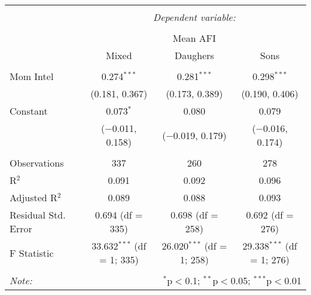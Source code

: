 
\begingroup 
\small 
\begin{tabular}{@{\extracolsep{1pt}}lccc} 
\\[-1.8ex]\hline 
\hline \\[-1.8ex] 
 & \multicolumn{3}{c}{\textit{Dependent variable:}} \\ 
\cline{2-4} 
\\[-1.8ex] & \multicolumn{3}{c}{Mean AFI} \\ 
 & Mixed & Daughers & Sons \\ 
\hline \\[-1.8ex] 
 Mom Intel & 0.274$^{***}$ & 0.281$^{***}$ & 0.298$^{***}$ \\ 
  & (0.181, 0.367) & (0.173, 0.389) & (0.190, 0.406) \\ 
  Constant & 0.073$^{*}$ & 0.080 & 0.079 \\ 
  & ($-$0.011, 0.158) & ($-$0.019, 0.179) & ($-$0.016, 0.174) \\ 
 \hline \\[-1.8ex] 
Observations & 337 & 260 & 278 \\ 
R$^{2}$ & 0.091 & 0.092 & 0.096 \\ 
Adjusted R$^{2}$ & 0.089 & 0.088 & 0.093 \\ 
Residual Std. Error & 0.694 (df = 335) & 0.698 (df = 258) & 0.692 (df = 276) \\ 
F Statistic & 33.632$^{***}$ (df = 1; 335) & 26.020$^{***}$ (df = 1; 258) & 29.338$^{***}$ (df = 1; 276) \\ 
\hline 
\hline \\[-1.8ex] 
\textit{Note:}  & \multicolumn{3}{r}{$^{*}$p$<$0.1; $^{**}$p$<$0.05; $^{***}$p$<$0.01} \\ 
\end{tabular} 
\endgroup 
